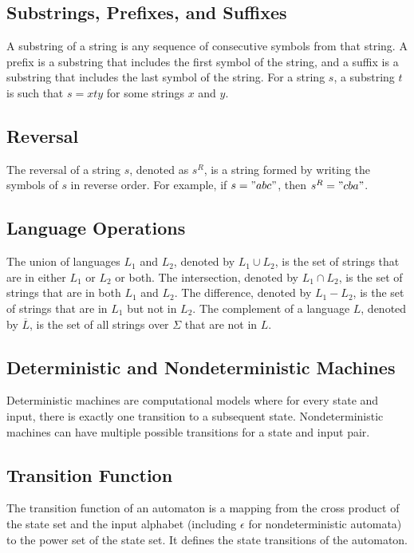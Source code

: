 \documentclass{article}
\begin{document}
\subsection{Substrings, Prefixes, and Suffixes}
A substring of a string is any sequence of consecutive symbols from that
string. A prefix is a substring that includes the first symbol of the string,
and a suffix is a substring that includes the last symbol of the string. For a
string $s$, a substring $t$ is such that $s = xty$ for some strings $x$ and
$y$.

\subsection{Reversal}
The reversal of a string $s$, denoted as $s^R$, is a string formed by writing
the symbols of $s$ in reverse order. For example, if $s = "abc"$, then $s^R =
"cba"$.


\subsection{Language Operations}
The union of languages $L_1$ and $L_2$, denoted by $L_1 \cup L_2$, is the set
of strings that are in either $L_1$ or $L_2$ or both. The intersection, denoted
by $L_1 \cap L_2$, is the set of strings that are in both $L_1$ and $L_2$. The
difference, denoted by $L_1 - L_2$, is the set of strings that are in $L_1$ but
not in $L_2$. The complement of a language $L$, denoted by $\overline{L}$, is
the set of all strings over $\Sigma$ that are not in $L$.

\subsection{Deterministic and Nondeterministic Machines}
Deterministic machines are computational models where for every state and
input, there is exactly one transition to a subsequent state. Nondeterministic
machines can have multiple possible transitions for a state and input pair.

\subsection{Transition Function}
The transition function of an automaton is a mapping from the cross product of
the state set and the input alphabet (including $\epsilon$ for nondeterministic
automata) to the power set of the state set. It defines the state transitions
of the automaton.
\end{document}
